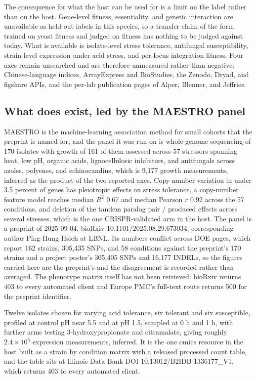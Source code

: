 The consequence for what the host can be used for is a limit on the label rather than on the
host. Gene-level fitness, essentiality, and genetic interaction are
unavailable as held-out labels in this species, so a transfer claim of the form trained on
yeast fitness and judged on  fitness has nothing to be judged against
today. What is available is isolate-level stress tolerance, antifungal susceptibility,
strain-level expression under acid stress, and per-locus integration fitness. Four axes remain
unsearched and are therefore unmeasured rather than negative: Chinese-language indices,
ArrayExpress and BioStudies, the Zenodo, Dryad, and figshare APIs, and the per-lab publication
pages of Alper, Blenner, and Jeffries.

\subsection{What does exist, led by the MAESTRO panel}\label{sec:pk-have}

 MAESTRO is the machine-learning
association method for small cohorts that the preprint is named for, and the panel it was run
on is whole-genome sequencing of 170
isolates with growth of 161 of them assessed across 57 stressors spanning heat, low pH,
organic acids, lignocellulosic inhibitors, and antifungals across azoles, polyenes, and
echinocandins, which is 9,177 growth measurements, inferred as the product of the two reported
axes. Copy-number variation in under 3.5 percent of genes has pleiotropic effects on stress
tolerance, a copy-number feature model reaches median $R^{2}$ 0.67 and median Pearson
$r$ 0.92 across the 57 conditions, and deletion of the tandem paralog pair
/ produced effects across several stresses, which is the one
CRISPR-validated arm in the host. The panel is a preprint of 2025-09-04, bioRxiv
10.1101/2025.08.29.673034, corresponding author Ping-Hung Hsieh at LBNL. Its numbers conflict
across DOE pages, which report 162 strains, 305,435 SNPs, and 58 conditions against the
preprint's 170 strains and a project poster's 305,405 SNPs and 16,177 INDELs, so the figures
carried here are the preprint's and the disagreement is recorded rather than averaged. The
phenotype matrix itself has not been retrieved: bioRxiv returns 403 to every automated client
and Europe PMC's full-text route returns 500 for the preprint identifier.

 Twelve isolates chosen for varying acid
tolerance, six tolerant and six susceptible, profiled at control pH near 5.5 and at pH 1.5,
sampled at 0 h and 1 h, with further arms testing 3-hydroxypropionate and citramalate, giving
roughly $2.4\times10^{5}$ expression measurements, inferred. It is the one omics resource in
the host built as a strain by condition matrix with a released processed count table, and the
table sits at Illinois Data Bank DOI 10.13012/B2IDB-1336177\_V1, which returns 403 to every
automated client.

